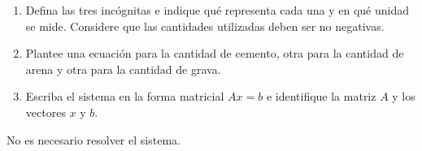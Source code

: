 \documentclass[10pt,a4]{examenEPN0}
\begin{document}
\begin{preguntas}
\begin{enumerate}
    \item Defina las tres incógnitas e indique qué representa cada una y en qué unidad se mide. Considere que las cantidades utilizadas deben ser no negativas. 
    \item Plantee una ecuación para la cantidad de cemento, otra para la cantidad de arena y otra para la cantidad de grava. 
    \item Escriba el sistema en la forma matricial $Ax=b$ e identifique la matriz $A$ y los vectores $x$ y $b$. 
\end{enumerate}
No es necesario resolver el sistema.









\vfill

\end{preguntas}



\final
\end{document}

